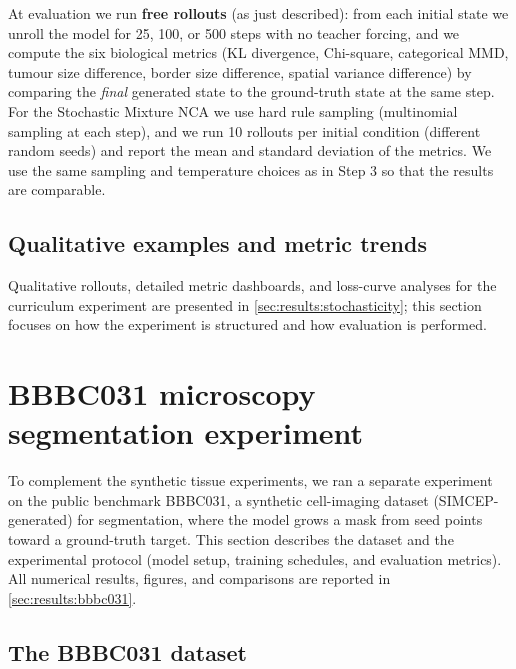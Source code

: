 At evaluation we run \textbf{free rollouts} (as just described): from each initial state we unroll the model for 25, 100, or 500 steps with no teacher forcing, and we compute the six biological metrics (KL divergence, Chi-square, categorical MMD, tumour size difference, border size difference, spatial variance difference) by comparing the \emph{final} generated state to the ground-truth state at the same step.
For the Stochastic Mixture NCA we use hard rule sampling (multinomial sampling at each step), and we run 10 rollouts per initial condition (different random seeds) and report the mean and standard deviation of the metrics.
We use the same sampling and temperature choices as in Step 3 so that the results are comparable.

\subsection{Qualitative examples and metric trends}
\label{sec:impl:curriculum:qualitative}

Qualitative rollouts, detailed metric dashboards, and loss-curve analyses for the curriculum experiment are presented in \cref{sec:results:stochasticity}; this section focuses on how the experiment is structured and how evaluation is performed.

\section{BBBC031 microscopy segmentation experiment}
\label{sec:impl:bbbc031}

To complement the synthetic tissue experiments, we ran a separate experiment on the public benchmark BBBC031, a synthetic cell-imaging dataset (SIMCEP-generated) for segmentation, where the model grows a mask from seed points toward a ground-truth target.
This section describes the dataset and the experimental protocol (model setup, training schedules, and evaluation metrics).
All numerical results, figures, and comparisons are reported in \cref{sec:results:bbbc031}.

\subsection{The BBBC031 dataset}
\label{sec:impl:bbbc031:dataset}


